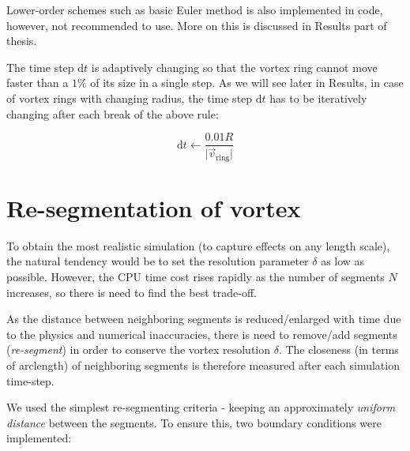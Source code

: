 Lower-order schemes such as basic Euler method is also implemented in code, however, not recommended to use. More on this is discussed in Results part of thesis.

The time step $\text{d}t$ is adaptively changing so that the vortex ring cannot move faster than a $1\%$ of its size in a single step. As we will see later in Results, in case of vortex rings with changing radius, the time step $\text{d}t$ has to be iteratively changing after each break of the above rule:

\begin{equation}
\text{d}t \leftarrow \frac{0.01 R}{\vert \vec{v}_{\text{ring}} \vert}
\label{adaptive_dt}
\end{equation}

\section{Re-segmentation of vortex}

To obtain the most realistic simulation (to capture effects on any length scale), the natural tendency would be to set the resolution parameter $\delta$ as low as possible. However, the CPU time cost rises rapidly as the number of segments $N$ increases, so there is need to find the best trade-off.

As the distance between neighboring segments is reduced/enlarged with time due to the physics and numerical inaccuracies, there is need to remove/add segments (\textit{re-segment}) in order to conserve the vortex resolution $\delta$. The closeness (in terms of arclength) of neighboring segments is therefore measured after each simulation time-step.

We used the simplest re-segmenting criteria - keeping an approximately \textit{uniform distance} between the segments. To ensure this, two boundary conditions were implemented:

